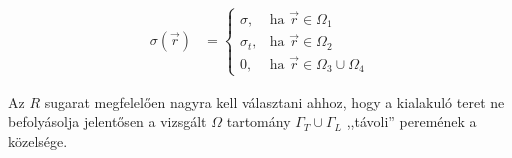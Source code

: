     \begin{align}
        \sigma(\vec{r}) &=
            \begin{cases}
                \sigma, & \text{ha } \vec{r} \in \Omega_1\\
                \sigma_t, & \text{ha } \vec{r} \in \Omega_2\\
                0, & \text{ha } \vec{r} \in \Omega_3 \cup \Omega_4
            \end{cases}
    \end{align}

    Az $R$ sugarat megfelelően nagyra kell választani ahhoz, hogy a kialakuló teret ne befolyásolja jelentősen a vizsgált $\Omega$ tartomány $\Gamma_T \cup \Gamma_L$ ,,távoli'' peremének a közelsége.
    
